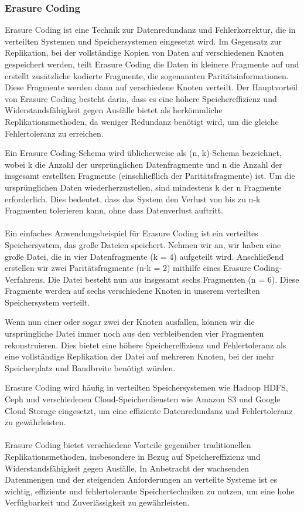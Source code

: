 \documentclass[../vs-script-first-v01.tex]{subfiles}
\begin{document}
\subsubsection{Erasure Coding}
Erasure Coding ist eine Technik zur Datenredundanz und Fehlerkorrektur, die in verteilten Systemen und Speichersystemen eingesetzt wird. Im Gegensatz zur Replikation, bei der vollständige Kopien von Daten auf verschiedenen Knoten gespeichert werden, teilt Erasure Coding die Daten in kleinere Fragmente auf und erstellt zusätzliche kodierte Fragmente, die sogenannten Paritätsinformationen. Diese Fragmente werden dann auf verschiedene Knoten verteilt. Der Hauptvorteil von Erasure Coding besteht darin, dass es eine höhere Speichereffizienz und Widerstandsfähigkeit gegen Ausfälle bietet als herkömmliche Replikationsmethoden, da weniger Redundanz benötigt wird, um die gleiche Fehlertoleranz zu erreichen.

Ein Erasure Coding-Schema wird üblicherweise als (n, k)-Schema bezeichnet, wobei k die Anzahl der ursprünglichen Datenfragmente und n die Anzahl der insgesamt erstellten Fragmente (einschließlich der Paritätsfragmente) ist. Um die ursprünglichen Daten wiederherzustellen, sind mindestens k der n Fragmente erforderlich. Dies bedeutet, dass das System den Verlust von bis zu n-k Fragmenten tolerieren kann, ohne dass Datenverlust auftritt.
\\\\
Ein einfaches Anwendungsbeispiel für Erasure Coding ist ein verteiltes Speichersystem, das große Dateien speichert. Nehmen wir an, wir haben eine große Datei, die in vier Datenfragmente (k = 4) aufgeteilt wird. Anschließend erstellen wir zwei Paritätsfragmente (n-k = 2) mithilfe eines Erasure Coding-Verfahrens. Die Datei besteht nun aus insgesamt sechs Fragmenten (n = 6). Diese Fragmente werden auf sechs verschiedene Knoten in unserem verteilten Speichersystem verteilt.

Wenn nun einer oder sogar zwei der Knoten ausfallen, können wir die ursprüngliche Datei immer noch aus den verbleibenden vier Fragmenten rekonstruieren. Dies bietet eine höhere Speichereffizienz und Fehlertoleranz als eine vollständige Replikation der Datei auf mehreren Knoten, bei der mehr Speicherplatz und Bandbreite benötigt würden.

Erasure Coding wird häufig in verteilten Speichersystemen wie Hadoop HDFS, Ceph und verschiedenen Cloud-Speicherdiensten wie Amazon S3 und Google Cloud Storage eingesetzt, um eine effiziente Datenredundanz und Fehlertoleranz zu gewährleisten.
\\\\
Erasure Coding bietet verschiedene Vorteile gegenüber traditionellen Replikationsmethoden, insbesondere in Bezug auf Speichereffizienz und Widerstandsfähigkeit gegen Ausfälle. In Anbetracht der wachsenden Datenmengen und der steigenden Anforderungen an verteilte Systeme ist es wichtig, effiziente und fehlertolerante Speichertechniken zu nutzen, um eine hohe Verfügbarkeit und Zuverlässigkeit zu gewährleisten.
\end{document}
